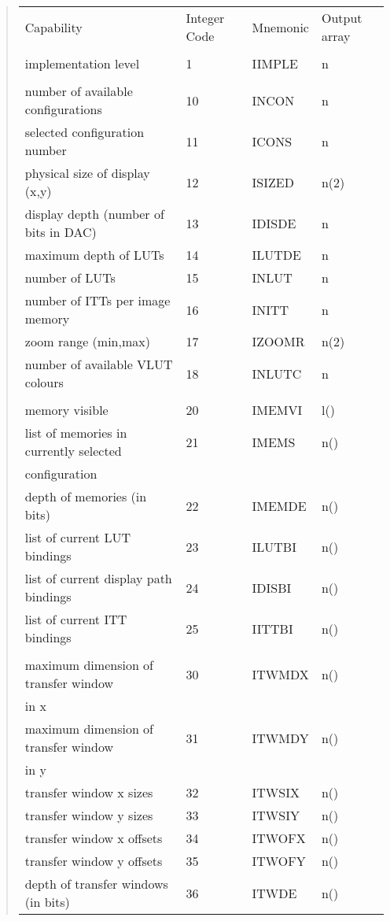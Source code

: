 \documentclass[11pt,nolof]{starlink}
\begin{document}
\begin{quote}
\begin{tabular}{llll}
Capability & Integer Code & Mnemonic & Output array \\
\\
implementation level & 1 & IIMPLE & n \\
\\
number of available configurations & 10 & INCON & n \\
selected configuration number & 11 & ICONS & n \\
physical size of display (x,y) & 12 & ISIZED & n(2) \\
display depth (number of bits in DAC) & 13 & IDISDE & n \\
maximum depth of LUTs & 14 & ILUTDE & n \\
number of LUTs & 15 & INLUT & n \\
number of ITTs per image memory & 16 & INITT & n \\
zoom range (min,max) & 17 & IZOOMR & n(2) \\
number of available VLUT colours & 18 & INLUTC & n \\
\\
memory visible & 20 & IMEMVI & l() \\
list of memories in currently selected & 21 & IMEMS & n() \\
\hfill configuration \\
depth of memories (in bits) & 22 & IMEMDE & n() \\
list of current LUT bindings & 23 & ILUTBI & n() \\
list of current display path bindings & 24 & IDISBI & n() \\
list of current ITT bindings & 25 & IITTBI & n() \\
\\
maximum dimension of transfer window & 30 & ITWMDX & n() \\
\hfill in x \\
maximum dimension of transfer window & 31 & ITWMDY & n() \\
\hfill in y \\
transfer window x sizes & 32 & ITWSIX & n() \\
transfer window y sizes & 33 & ITWSIY & n() \\
transfer window x offsets & 34 & ITWOFX & n() \\
transfer window y offsets & 35 & ITWOFY & n() \\
depth of transfer windows (in bits) & 36 & ITWDE & n() \\
\end{tabular}
\end{quote}
\end{document}
